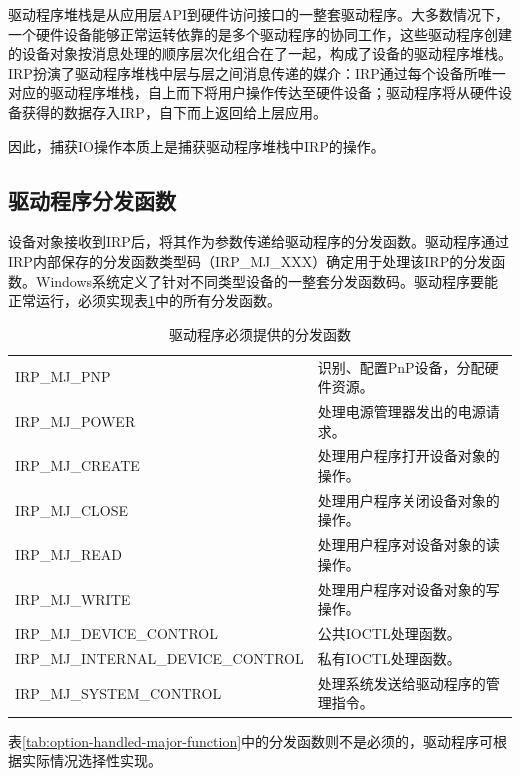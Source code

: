 驱动程序堆栈是从应用层API到硬件访问接口的一整套驱动程序。大多数情况下，一个硬件设备能够正常运转依靠的是多个驱动程序的协同工作，这些驱动程序创建的设备对象按消息处理的顺序层次化组合在了一起，构成了设备的驱动程序堆栈。IRP扮演了驱动程序堆栈中层与层之间消息传递的媒介：IRP通过每个设备所唯一对应的驱动程序堆栈，自上而下将用户操作传达至硬件设备；驱动程序将从硬件设备获得的数据存入IRP，自下而上返回给上层应用。

因此，捕获IO操作本质上是捕获驱动程序堆栈中IRP的操作。

\subsection{驱动程序分发函数}
设备对象接收到IRP后，将其作为参数传递给驱动程序的分发函数。驱动程序通过IRP内部保存的分发函数类型码（IRP\_MJ\_XXX）确定用于处理该IRP的分发函数。Windows系统定义了针对不同类型设备的一整套分发函数码。驱动程序要能正常运行，必须实现表\ref{tab:must-handled-major-function}中的所有分发函数。

\begin{table}[!htb]
\centering
\caption{驱动程序必须提供的分发函数}
\begin{tabular}{|ll|}
\hline IRP\_MJ\_PNP  & 识别、配置PnP设备，分配硬件资源。 \\
       IRP\_MJ\_POWER & 处理电源管理器发出的电源请求。 \\
       IRP\_MJ\_CREATE & 处理用户程序打开设备对象的操作。 \\
       IRP\_MJ\_CLOSE & 处理用户程序关闭设备对象的操作。 \\
       IRP\_MJ\_READ & 处理用户程序对设备对象的读操作。 \\
       IRP\_MJ\_WRITE & 处理用户程序对设备对象的写操作。 \\
       IRP\_MJ\_DEVICE\_CONTROL & 公共IOCTL处理函数。 \\
       IRP\_MJ\_INTERNAL\_DEVICE\_CONTROL & 私有IOCTL处理函数。 \\
       IRP\_MJ\_SYSTEM\_CONTROL & 处理系统发送给驱动程序的管理指令。 \\
\hline
\end{tabular}
\label{tab:must-handled-major-function}
\end{table}

表\ref{tab:option-handled-major-function}中的分发函数则不是必须的，驱动程序可根据实际情况选择性实现。

